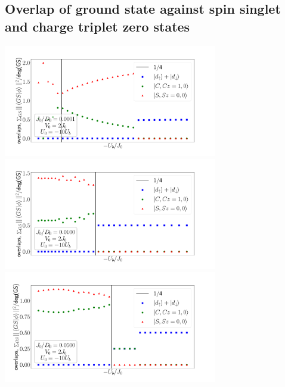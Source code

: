 \subsection*{Overlap of ground state against spin singlet and charge triplet zero states}
\begin{center}
	\includegraphics[width=0.7\textwidth]{../figures/overlaps_gs-J=0.100.pdf}\\
	\includegraphics[width=0.7\textwidth]{../figures/overlaps_gs-J=10.000.pdf}\\
	\includegraphics[width=0.7\textwidth]{../figures/overlaps_gs-J=50.000.pdf}
\end{center}

